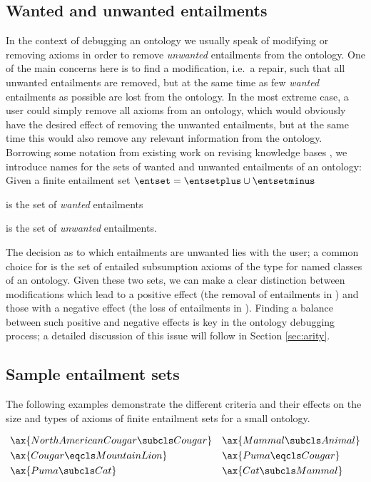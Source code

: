 \subsection{Wanted and unwanted entailments}
\label{sec:wantedunwanted}
In the context of debugging an ontology we usually speak of modifying or removing axioms in order to remove  \emph{unwanted} entailments from the ontology. One of the main concerns here is to find a modification, i.e.\ a repair, such that all unwanted entailments are removed, but at the same time as few \emph{wanted} entailments as possible are lost from the ontology. In the most extreme case, a user could simply remove all axioms from an ontology, which would obviously have the desired effect of removing the unwanted entailments, but at the same time this would also remove any relevant information from the ontology. Borrowing some notation from existing work on revising knowledge bases \cite{shchekotykhin12aa,nikitina12aa}, we introduce names for the sets of wanted and unwanted entailments of an ontology: Given a finite entailment set $\entset = \entsetplus \cup \entsetminus$
\begin{compactitem}
\item \entsetplus is the set of \emph{wanted} entailments
\item \entsetminus  is the set of \emph{unwanted} entailments.
\end{compactitem}

The decision as to which entailments are unwanted lies with the user; a common choice for \entsetminus is the set of entailed subsumption axioms of the type  for named classes  of an ontology. Given these two sets, we can make a clear distinction between modifications which lead to a positive effect (the removal of entailments in \entsetminus) and those with a negative effect (the loss of entailments in \entsetplus). Finding a balance between such positive and negative effects is key in the ontology debugging process; a detailed discussion of this issue will follow in Section \ref{sec:arity}.


\subsection{Sample entailment sets}

The following examples demonstrate the different criteria and their effects on the size and types of axioms of finite entailment sets for a small ontology.

\begin{examp}
\begin{align*}
&\ax{NorthAmericanCougar\subcls Cougar} &&\ax{Mammal \subcls Animal}\\
&\ax{Cougar \eqcls MountainLion} &&\ax{Puma \eqcls Cougar} \\
&\ax{Puma \subcls Cat} &&\ax{Cat \subcls Mammal}\\
\end{align*}
\end{examp}

